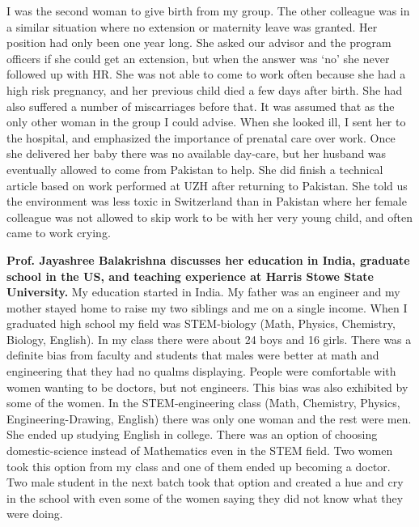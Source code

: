 \documentclass[utf8]{frontiersSCNS} %
\begin{document}
I was the second woman to give birth from my group. The other colleague was in a similar situation where no extension or maternity leave was granted. Her position had only been one year long. She asked our advisor and the program officers if she could get an extension, but when the answer was `no' she never followed up with HR. She was not able to come to work often because she had a high risk pregnancy, and her previous child died a few days after birth. She had also suffered a number of miscarriages before that. It was assumed that as the only other woman in the group I could advise. When she looked ill, I sent her to the hospital, and emphasized the importance of prenatal care over work. Once she delivered her baby there was no available day-care, but her husband was eventually allowed to come from Pakistan to help. She did finish a technical article based on work performed at UZH after returning to Pakistan. She told us the environment was less toxic in Switzerland than in Pakistan where her female colleague was not allowed to skip work to be with her very young child, and often came to work crying. 

{\bf Prof. Jayashree Balakrishna discusses her education in India, graduate school in the US, and teaching experience at Harris Stowe State University.}
My education started in India. My father was an engineer and my mother stayed home to raise my two siblings and me on a single income. When I graduated high school my field was STEM-biology (Math, Physics, Chemistry, Biology, English).  In my class there were about 24 boys and 16 girls. There was a definite bias from faculty and students that males were better at math and engineering that they had no qualms displaying. People were comfortable with women wanting to be doctors, but not engineers. This bias was also exhibited by some of the women. In the STEM-engineering class (Math, Chemistry, Physics, Engineering-Drawing, English) there was only one woman and the rest were men. She ended up studying English in college. There was an option of choosing domestic-science instead of Mathematics even in the STEM field. Two women took this option from my class and one of them ended up becoming a doctor. Two male student in the next batch took that option and created a hue and cry in the school with even some of the women saying they did not know what they were doing.  
\end{document}
